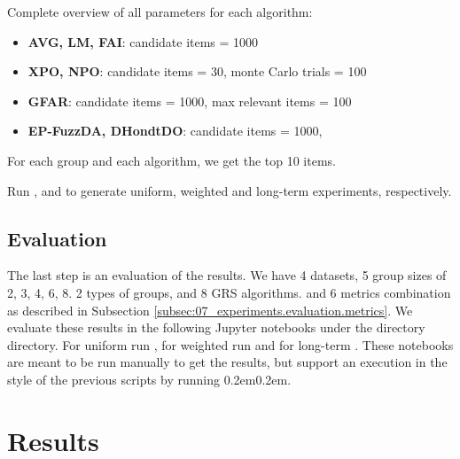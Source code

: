         Complete overview of all parameters for each algorithm:
        \begin{itemize}
            \item \textbf{AVG, LM, FAI}: candidate items = 1000
            \item \textbf{XPO, NPO}: candidate items = 30, monte Carlo trials = 100
            \item \textbf{GFAR}: candidate items = 1000, max relevant items = 100
            \item \textbf{EP-FuzzDA, DHondtDO}: candidate items = 1000, 
        \end{itemize}

        For each group and each algorithm, we get the top 10 items.

        Run ,
        \newline
         and
        \newline
         to generate uniform, weighted and long-term experiments, respectively.
    
    \subsection{Evaluation}
        The last step is an evaluation of the results. We have 4 datasets, 5 group sizes of 2, 3, 4, 6, 8. 2 types of groups, and 8 GRS algorithms. and 6 metrics combination as described in Subsection \ref{subsec:07_experiments.evaluation.metrics}.
        We evaluate these results in the following Jupyter notebooks under the directory  directory. For uniform run , 
 for weighted run  and for long-term . These notebooks are meant to be run manually to get the results, but support an execution in the style of the previous scripts by running \kern 0.2em\kern 0.2em.
        

\section{Results}

